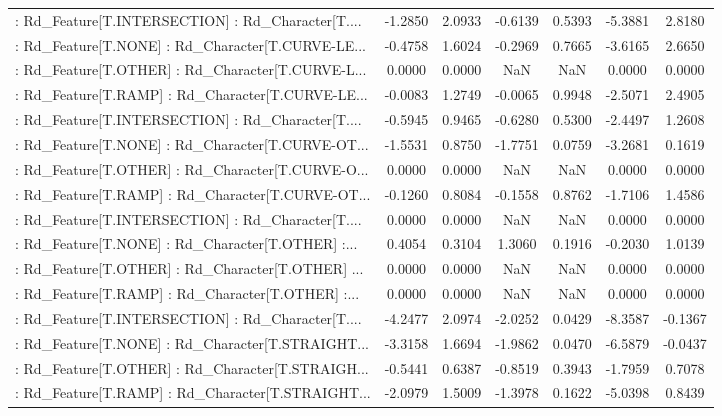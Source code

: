 \begin{longtable}{p{4cm}cccccc}
 : Rd\_Feature[T.INTERSECTION] : Rd\_Character[T.... & -1.2850 &    2.0933 & -0.6139 &       0.5393 & -5.3881 &  2.8180 \\
 : Rd\_Feature[T.NONE] : Rd\_Character[T.CURVE-LE... & -0.4758 &    1.6024 & -0.2969 &       0.7665 & -3.6165 &  2.6650 \\
 : Rd\_Feature[T.OTHER] : Rd\_Character[T.CURVE-L... &  0.0000 &    0.0000 &     NaN &          NaN &  0.0000 &  0.0000 \\
 : Rd\_Feature[T.RAMP] : Rd\_Character[T.CURVE-LE... & -0.0083 &    1.2749 & -0.0065 &       0.9948 & -2.5071 &  2.4905 \\
 : Rd\_Feature[T.INTERSECTION] : Rd\_Character[T.... & -0.5945 &    0.9465 & -0.6280 &       0.5300 & -2.4497 &  1.2608 \\
 : Rd\_Feature[T.NONE] : Rd\_Character[T.CURVE-OT... & -1.5531 &    0.8750 & -1.7751 &       0.0759 & -3.2681 &  0.1619 \\
 : Rd\_Feature[T.OTHER] : Rd\_Character[T.CURVE-O... &  0.0000 &    0.0000 &     NaN &          NaN &  0.0000 &  0.0000 \\
 : Rd\_Feature[T.RAMP] : Rd\_Character[T.CURVE-OT... & -0.1260 &    0.8084 & -0.1558 &       0.8762 & -1.7106 &  1.4586 \\
 : Rd\_Feature[T.INTERSECTION] : Rd\_Character[T.... &  0.0000 &    0.0000 &     NaN &          NaN &  0.0000 &  0.0000 \\
 : Rd\_Feature[T.NONE] : Rd\_Character[T.OTHER] :... &  0.4054 &    0.3104 &  1.3060 &       0.1916 & -0.2030 &  1.0139 \\
 : Rd\_Feature[T.OTHER] : Rd\_Character[T.OTHER] ... &  0.0000 &    0.0000 &     NaN &          NaN &  0.0000 &  0.0000 \\
 : Rd\_Feature[T.RAMP] : Rd\_Character[T.OTHER] :... &  0.0000 &    0.0000 &     NaN &          NaN &  0.0000 &  0.0000 \\
 : Rd\_Feature[T.INTERSECTION] : Rd\_Character[T.... & -4.2477 &    2.0974 & -2.0252 &       0.0429 & -8.3587 & -0.1367 \\
 : Rd\_Feature[T.NONE] : Rd\_Character[T.STRAIGHT... & -3.3158 &    1.6694 & -1.9862 &       0.0470 & -6.5879 & -0.0437 \\
 : Rd\_Feature[T.OTHER] : Rd\_Character[T.STRAIGH... & -0.5441 &    0.6387 & -0.8519 &       0.3943 & -1.7959 &  0.7078 \\
 : Rd\_Feature[T.RAMP] : Rd\_Character[T.STRAIGHT... & -2.0979 &    1.5009 & -1.3978 &       0.1622 & -5.0398 &  0.8439 \\

\end{longtable}
